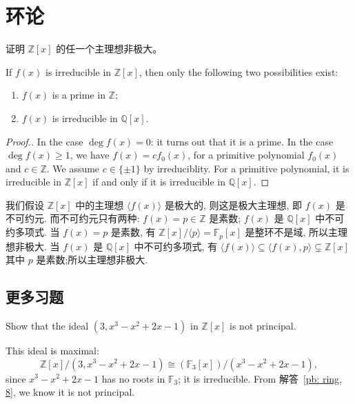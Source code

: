 \section{环论}
\setcounter{pb}{8}
\begin{problem}
    \label{pb: ring, 8}
    证明 $ \mathbb{Z}[x] $ 的任一个主理想非极大。
\end{problem}

\begin{lemma}
    If $f(x)$ is irreducible in $\mathbb{Z}[x]$, then only the following two possibilities exist: 
    \begin{enumerate}
        \item $f(x)$ is a prime in $\mathbb{Z}$;
        \item $f(x)$ is irreducible in $\mathbb{Q}[x]$.
    \end{enumerate}
\end{lemma}
\begin{proof}[Proof.]
    In the case $\deg f(x)=0$: it turns out that it is a prime. In the case $\deg f(x)\geq1$, we have $f(x)=c f_0(x)$, 
    for a primitive polynomial $f_0(x)$ and $c\in\mathbb{Z}$. We assume $c\in\{\pm1\}$ by irreduciblity. 
    For a primitive polynomial, it is irreducible in $\mathbb{Z}[x]$ if and only if it is irreducible in $\mathbb{Q}[x]$.
\end{proof}

\begin{solution}
    我们假设 $\mathbb{Z}[x]$ 中的主理想 $\langle f(x) \rangle $ 是极大的, 则这是极大主理想, 即 $f(x)$ 是不可约元. 
    而不可约元只有两种: $f(x)=p\in\mathbb{Z}$ 是素数; $f(x)$ 是 $\mathbb{Q}[x]$ 中不可约多项式. 
    当 $f(x)=p$ 是素数, 有 $\mathbb{Z}[x]/\langle p \rangle=\mathbb{F}_{p}[x]$ 是整环不是域, 所以主理想非极大. 
    当 $f(x)$ 是 $\mathbb{Q}[x]$ 中不可约多项式, 有 $\langle f(x) \rangle \subseteq \langle f(x),p \rangle \subsetneq \mathbb{Z}[x]$ 其中 $p$ 是素数;所以主理想非极大.
\end{solution}

\subsection{更多习题}
\setcounter{pb}{13}

\begin{problem}
    Show that the ideal $(3, x^3-x^2 + 2x- 1)$ in $\mathbb{Z}[x]$ is not principal.
\end{problem}

\begin{solution}
    This ideal is maximal:
        \[
            \mathbb{Z}[x]/(3, x^3-x^2 + 2x- 1)\cong({\mathbb{F}_3[x]})/( x^3-x^2 + 2x- 1),
        \]
    since $x^3-x^2 + 2x- 1$ has no roots in $\mathbb{F}_3$; it is irreducible. 
    From 解答~\ref{pb: ring, 8}, we know it is not principal.
\end{solution}

